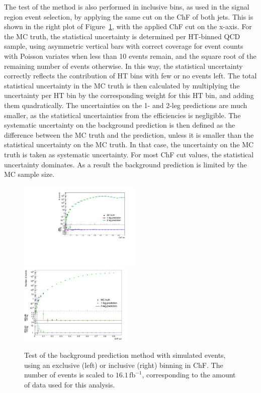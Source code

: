 The test of the method is also performed in inclusive bins, as used in the signal region event selection, by applying the same cut on the ChF of both jets. This is shown in the right plot of Figure~\ref{fig:closuretest}, with the applied ChF cut on the x-axis. For the MC truth, the statistical uncertainty is determined  per HT-binned \ac{QCD} sample, using asymmetric vertical bars with correct coverage for event counts with Poisson variates when less than 10 events remain, and the square root of the remaining number of events otherwise. In this way, the statistical uncertainty correctly reflects the contribution of HT bins with few or no events left. The total statistical uncertainty in the MC truth is then calculated by multiplying the uncertainty per HT bin by the corresponding weight for this HT bin, and adding them quadratically. The uncertainties on the 1- and 2-leg predictions are much smaller, as the statistical uncertainties from the efficiencies is negligible. The systematic uncertainty on the background prediction is then defined as the difference between the MC truth and the prediction, unless it is smaller than the statistical uncertainty on the MC truth. In that case, the uncertainty on the MC truth is taken as systematic uncertainty. For most ChF cut values, the statistical uncertainty dominates. As a result the background prediction is limited by the MC sample size.

\begin{figure}[ht]
  \includegraphics[width=0.52\textwidth]{figures/closure_test_QCD_exclusive_filters.pdf}%
  \includegraphics[width=0.48\textwidth]{figures/closure_test.pdf}\hfill
  \caption{Test of the background prediction method with simulated events, using an exclusive (left) or inclusive (right) binning in ChF. The number of events is scaled to $16.1\, \mathrm{fb}^{-1}$, corresponding to the amount of data used for this analysis.}
  \label{fig:closuretest}
\end{figure}

